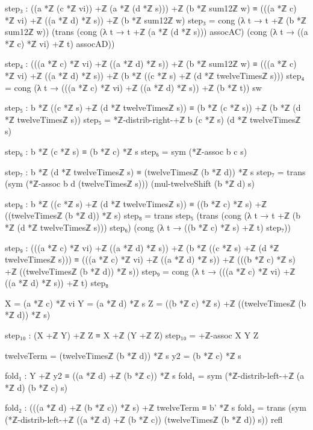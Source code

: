 \documentclass[11pt,a4paper]{book}
\begin{document}
\begin{code}
        step₃ : ((a *ℤ (c *ℤ vi)) +ℤ (a *ℤ (d *ℤ s))) +ℤ (b *ℤ sum12ℤ w)
                  ≡ (((a *ℤ c) *ℤ vi) +ℤ ((a *ℤ d) *ℤ s)) +ℤ (b *ℤ sum12ℤ w)
        step₃ =
          cong (λ t → t +ℤ (b *ℤ sum12ℤ w))
            (trans
              (cong (λ t → t +ℤ (a *ℤ (d *ℤ s))) assocAC)
              (cong (λ t → ((a *ℤ c) *ℤ vi) +ℤ t) assocAD))

        step₄ : (((a *ℤ c) *ℤ vi) +ℤ ((a *ℤ d) *ℤ s)) +ℤ (b *ℤ sum12ℤ w)
                  ≡ (((a *ℤ c) *ℤ vi) +ℤ ((a *ℤ d) *ℤ s)) +ℤ (b *ℤ ((c *ℤ s) +ℤ (d *ℤ twelveTimesℤ s)))
        step₄ = cong (λ t → (((a *ℤ c) *ℤ vi) +ℤ ((a *ℤ d) *ℤ s)) +ℤ (b *ℤ t)) sw

        step₅ : b *ℤ ((c *ℤ s) +ℤ (d *ℤ twelveTimesℤ s))
                  ≡ (b *ℤ (c *ℤ s)) +ℤ (b *ℤ (d *ℤ twelveTimesℤ s))
        step₅ = *ℤ-distrib-right-+ℤ b (c *ℤ s) (d *ℤ twelveTimesℤ s)

        step₆ : b *ℤ (c *ℤ s) ≡ (b *ℤ c) *ℤ s
        step₆ = sym (*ℤ-assoc b c s)

        step₇ : b *ℤ (d *ℤ twelveTimesℤ s) ≡ (twelveTimesℤ (b *ℤ d)) *ℤ s
        step₇ =
          trans
            (sym (*ℤ-assoc b d (twelveTimesℤ s)))
            (mul-twelveShift (b *ℤ d) s)

        step₈ : b *ℤ ((c *ℤ s) +ℤ (d *ℤ twelveTimesℤ s))
                  ≡ ((b *ℤ c) *ℤ s) +ℤ ((twelveTimesℤ (b *ℤ d)) *ℤ s)
        step₈ =
          trans
            step₅
            (trans
              (cong (λ t → t +ℤ (b *ℤ (d *ℤ twelveTimesℤ s))) step₆)
              (cong (λ t → ((b *ℤ c) *ℤ s) +ℤ t) step₇))

        step₉ : (((a *ℤ c) *ℤ vi) +ℤ ((a *ℤ d) *ℤ s)) +ℤ (b *ℤ ((c *ℤ s) +ℤ (d *ℤ twelveTimesℤ s)))
                  ≡ (((a *ℤ c) *ℤ vi) +ℤ ((a *ℤ d) *ℤ s)) +ℤ (((b *ℤ c) *ℤ s) +ℤ ((twelveTimesℤ (b *ℤ d)) *ℤ s))
        step₉ = cong (λ t → (((a *ℤ c) *ℤ vi) +ℤ ((a *ℤ d) *ℤ s)) +ℤ t) step₈

        X = (a *ℤ c) *ℤ vi
        Y = (a *ℤ d) *ℤ s
        Z = ((b *ℤ c) *ℤ s) +ℤ ((twelveTimesℤ (b *ℤ d)) *ℤ s)

        step₁₀ : (X +ℤ Y) +ℤ Z ≡ X +ℤ (Y +ℤ Z)
        step₁₀ = +ℤ-assoc X Y Z

        twelveTerm = (twelveTimesℤ (b *ℤ d)) *ℤ s
        y2 = (b *ℤ c) *ℤ s

        fold₁ : Y +ℤ y2 ≡ ((a *ℤ d) +ℤ (b *ℤ c)) *ℤ s
        fold₁ = sym (*ℤ-distrib-left-+ℤ (a *ℤ d) (b *ℤ c) s)

        fold₂ : (((a *ℤ d) +ℤ (b *ℤ c)) *ℤ s) +ℤ twelveTerm ≡ b' *ℤ s
        fold₂ =
          trans
            (sym (*ℤ-distrib-left-+ℤ ((a *ℤ d) +ℤ (b *ℤ c)) (twelveTimesℤ (b *ℤ d)) s))
            refl


\end{code}
\end{document}
